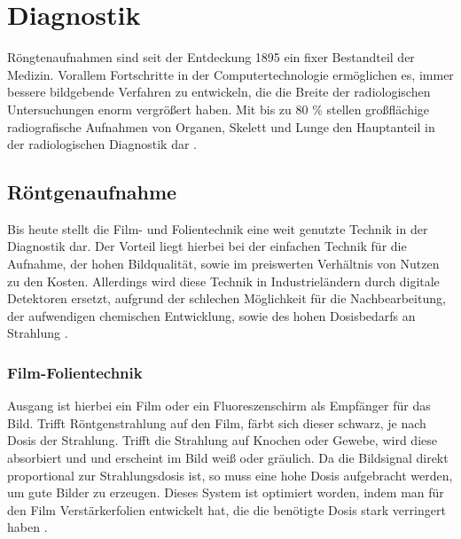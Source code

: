 \section{Diagnostik}
\label{sec:Diagnostik}
Röngtenaufnahmen sind seit der Entdeckung 1895 ein fixer Bestandteil der Medizin. Vorallem Fortschritte in der Computertechnologie
ermöglichen es, immer bessere bildgebende Verfahren zu entwickeln, die die Breite der radiologischen Untersuchungen enorm vergrößert
haben. Mit bis zu 80 \% stellen großflächige radiografische Aufnahmen von Organen, Skelett und Lunge den Hauptanteil in der radiologischen
Diagnostik dar \cite{MedizinischePhysik}.

\subsection{Röntgenaufnahme}
\label{sec:Röntgenaufnahme}
Bis heute stellt die Film- und Folientechnik eine weit genutzte Technik in der Diagnostik dar. Der Vorteil liegt hierbei
bei der einfachen Technik für die Aufnahme, der hohen Bildqualität, sowie im preiswerten Verhältnis von Nutzen zu den Kosten. Allerdings 
wird diese Technik in Industrieländern durch digitale Detektoren ersetzt, aufgrund der schlechen Möglichkeit für die Nachbearbeitung, 
der aufwendigen chemischen Entwicklung, sowie des hohen Dosisbedarfs an Strahlung \cite{MedizinischePhysik}.



\subsubsection{Film-Folientechnik}
\label{subsubsec:filmfolientechnik}
Ausgang ist hierbei ein Film oder ein Fluoreszenschirm als Empfänger für das Bild. Trifft Röntgenstrahlung auf den Film,
färbt sich dieser schwarz, je nach Dosis der Strahlung. Trifft die Strahlung auf Knochen oder Gewebe, wird diese absorbiert und 
und erscheint im Bild weiß oder gräulich. Da die Bildsignal direkt proportional zur Strahlungsdosis ist, so muss eine hohe Dosis 
aufgebracht werden, um gute Bilder zu erzeugen. Dieses System ist optimiert worden, indem man für den Film Verstärkerfolien entwickelt hat,
die die benötigte Dosis stark verringert haben \cite{Medizintechnik}. 

